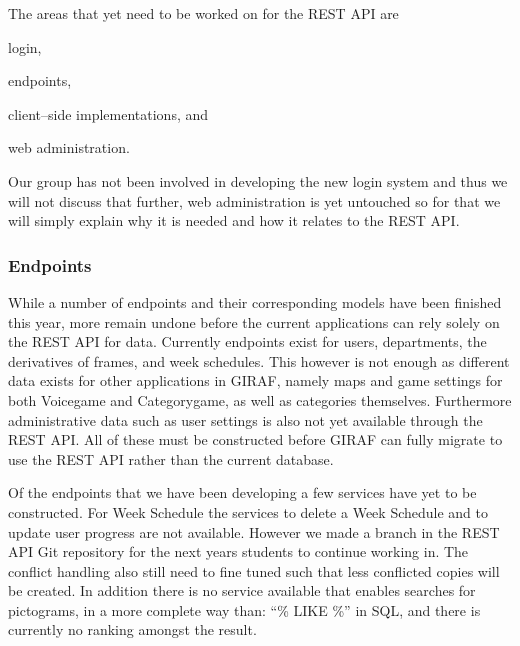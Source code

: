 The areas that yet need to be worked on for the REST API are
\begin{enumberate*}
\item login, 
\item endpoints, 
\item client--side implementations, and 
\item web administration.
\end{enumberate*}
Our group has not been involved in developing the new login system and thus we will not discuss that further, web administration is yet untouched so for that we will simply explain why it is needed and how it relates to the REST API.

\subsubsection*{Endpoints}
While a number of endpoints and their corresponding models have been finished this year, more remain undone before the current applications can rely solely on the REST API for data.
Currently endpoints exist for users, departments, the derivatives of frames, and week schedules.
This however is not enough as different data exists for other applications in GIRAF, namely maps and game settings for both Voicegame and Categorygame, as well as categories themselves.
Furthermore administrative data such as user settings is also not yet available through the REST API.
All of these must be constructed before GIRAF can fully migrate to use the REST API rather than the current database.

Of the endpoints that we have been developing a few services have yet to be constructed.
For Week Schedule the services to delete a Week Schedule and to update user progress are not available.
However we made a branch in the REST API Git repository for the next years students to continue working in.
The conflict handling also still need to fine tuned such that less conflicted copies will be created.
In addition there is no service available that enables searches for pictograms, in a more complete way than: ``\% LIKE \%'' in SQL, and there is currently no ranking amongst the result.

